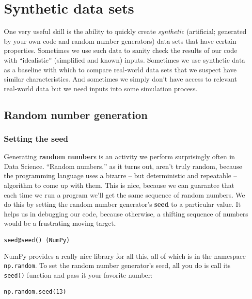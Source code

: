 
\chapter{Synthetic data sets}


One very useful skill is the ability to quickly create \textit{synthetic}
(artificial; generated by your own code and random-number generators) data
sets that have certain properties. Sometimes we use such data to sanity check
the results of our code with ``idealistic'' (simplified and known) inputs.
Sometimes we use synthetic data as a baseline with which to compare real-world
data sets that we suspect have similar characteristics. And sometimes we
simply don't have access to relevant real-world data but we need inputs into
some simulation process.

\section{Random number generation}


\subsection{Setting the seed}

Generating \textbf{random number}s is an activity we perform surprisingly often
in Data Science. ``Random numbers,'' as it turns out, aren't truly random,
because the programming language uses a bizarre -- but deterministic and
repeatable -- algorithm to come up with them. This is nice, because we can
guarantee that each time we run a program we'll get the same sequence of random
numbers. We do this by setting the random number generator's \textbf{seed} to a
particular value. It helps us in debugging our code, because otherwise, a
shifting sequence of numbers would be a frustrating moving target. 

\texttt{seed@\texttt{seed()} (NumPy)}

NumPy provides a really nice library for all this, all of which is in the
namespace \texttt{np.random}. To set the random number generator's seed, all
you do is call its \texttt{seed()} function and pass it your favorite number:

\begin{Verbatim}[fontsize=\small,samepage=true,frame=single,framesep=3mm]
np.random.seed(13)
\end{Verbatim}

